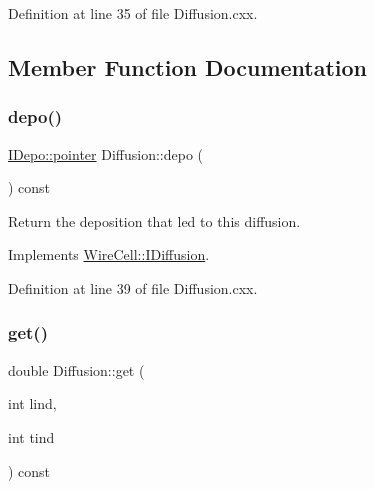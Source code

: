Definition at line 35 of file Diffusion.\+cxx.



\subsection{Member Function Documentation}
\mbox{\label{class_wire_cell_1_1_diffusion_a6d2cefc927cf2ae6c85587a7f579c01d}} 
\subsubsection{\texorpdfstring{depo()}{depo()}}
{\footnotesize\ttfamily \hyperlink{class_wire_cell_1_1_i_data_aff870b3ae8333cf9265941eef62498bc}{I\+Depo\+::pointer} Diffusion\+::depo (\begin{DoxyParamCaption}{ }\end{DoxyParamCaption}) const\hspace{0.3cm}{\ttfamily [virtual]}}



Return the deposition that led to this diffusion. 



Implements \hyperlink{class_wire_cell_1_1_i_diffusion_a657118deda45efadd86ec286ee9242a7}{Wire\+Cell\+::\+I\+Diffusion}.



Definition at line 39 of file Diffusion.\+cxx.

\mbox{\label{class_wire_cell_1_1_diffusion_a765cac5acd074254aef9782b37292c1a}} 
\subsubsection{\texorpdfstring{get()}{get()}}
{\footnotesize\ttfamily double Diffusion\+::get (\begin{DoxyParamCaption}\item[{int}]{lind,  }\item[{int}]{tind }\end{DoxyParamCaption}) const\hspace{0.3cm}{\ttfamily [virtual]}}



